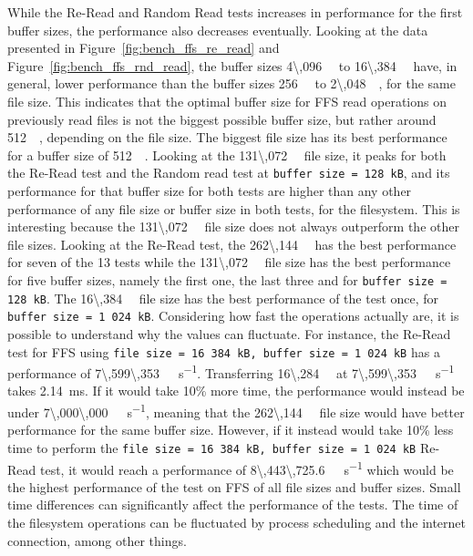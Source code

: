 While the \mbox{Re-Read} and Random Read tests increases in performance for the first buffer sizes, the performance also decreases eventually. Looking at the data presented in Figure~\ref{fig:bench_ffs_re_read} and Figure~\ref{fig:bench_ffs_rnd_read}, the buffer sizes \SI[per-mode = symbol]{4\,096}{\kilo\byte} to \SI[per-mode = symbol]{16\,384}{\kilo\byte} have, in general, lower performance than the buffer sizes \SI[per-mode = symbol]{256}{\kilo\byte} to \SI[per-mode = symbol]{2\,048}{\kilo\byte}, for the same file size. This indicates that the optimal buffer size for \gls{FFS} read operations on previously read files is not the biggest possible buffer size, but rather around \SI[per-mode = symbol]{512}{\kilo\byte}, depending on the file size. The biggest file size has its best performance for a buffer size of \SI[per-mode = symbol]{512}{\kilo\byte}. Looking at the \SI[per-mode = symbol]{131\,072}{\kilo\byte} file size, it peaks for both the \mbox{Re-Read} test and the Random read test at \texttt{buffer size = 128\,kB}, and its performance for that buffer size for both tests are higher than any other performance of any file size or buffer size in both tests, for the filesystem. This is interesting because the \SI[per-mode = symbol]{131\,072}{\kilo\byte} file size does not always outperform the other file sizes. Looking at the \mbox{Re-Read} test, the \SI[per-mode = symbol]{262\,144}{\kilo\byte} has the best performance for seven of the 13 tests while the \SI[per-mode = symbol]{131\,072}{\kilo\byte} file size has the best performance for five buffer sizes, namely the first one, the last three and for \texttt{buffer size = 128\,kB}. The \SI[per-mode = symbol]{16\,384}{\kilo\byte} file size has the best performance of the test once, for \texttt{buffer size = 1\,024\,kB}. Considering how fast the operations actually are, it is possible to understand why the values can fluctuate. For instance, the \mbox{Re-Read} test for \gls{FFS} using \texttt{file size = 16\,384\,kB, buffer size = 1\,024\,kB} has a performance of \SI[per-mode = symbol]{7\,599\,353}{\kilo\byte\per\second}. Transferring \SI[per-mode = symbol]{16\,284}{\kilo\byte} at \SI[per-mode = symbol]{7\,599\,353}{\kilo\byte\per\second} takes \SI[per-mode = symbol]{2.14}{\milli\second}. If it would take 10\% more time, the performance would instead be under \SI[per-mode = symbol]{7\,000\,000}{\kilo\byte\per\second}, meaning that the \SI[per-mode = symbol]{262\,144}{\kilo\byte} file size would have better performance for the same buffer size. However, if it instead would take 10\% less time to perform the \texttt{file size = 16\,384\,kB, buffer size = 1\,024\,kB} \mbox{Re-Read} test, it would reach a performance of \SI[per-mode = symbol]{8\,443\,725.6}{\kilo\byte\per\second} which would be the highest performance of the test on \gls{FFS} of all file sizes and buffer sizes. Small time differences can significantly affect the performance of the tests. The time of the filesystem operations can be fluctuated by process scheduling and the internet connection, among other things.

